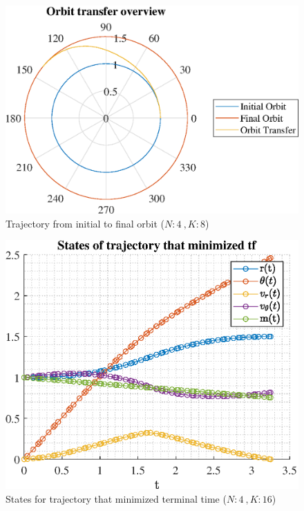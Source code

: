 \documentclass[]{article}
\begin{document}
	\begin{figure}
		\centering
		\includegraphics[scale=0.75]{orbit_N4_K8_C2_tf.eps}
		\caption{Trajectory from initial to final orbit (\(N:4\ , K:8\))}
		\label{fig:orbit_N4_K8_C2_tf}
	\end{figure}
	\begin{figure}
		\centering
		\includegraphics[scale=0.75]{states_N4_K16_C2_tf.eps}
		\caption{States for trajectory that minimized terminal time (\(N:4\ , K:16\))}
		\label{fig:states_N4_K16_C2_tf}
	\end{figure}
\end{document}
